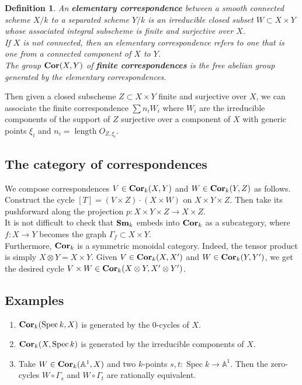 \documentclass[a4paper, 11pt]{article} %
\newtheorem{definition}[theorem]{Definition}
\theoremstyle{remark}
\newcommand{\?}{{\color{red} ???}}
\newcommand{\mb}{\mathbb}
\newcommand{\A}{\mb{A}}
\newcommand{\catname}[1]{{\normalfont\textbf{#1}}}
\newcommand{\Sm}{\catname{Sm}}
\newcommand{\Cor}{\catname{Cor}}
\DeclareMathOperator{\Spec}{Spec}
\DeclareMathOperator{\len}{length}
\begin{document}
\begin{definition}
An \textbf{elementary correspondence} between a smooth connected scheme $X/k$ to a separated scheme $Y/k$ is an irreducible closed subset $W\subset X\times Y$ whose associated integral subscheme is finite and surjective over $X$. \\ 

If $X$ is not connected, then an elementary correspondence refers to one that is one from a connected component of $X$ to $Y$.   \\ 

The group $\Cor(X, Y)$ of \textbf{finite correspondences} is the free abelian group generated by the elementary correspondences.
\end{definition} 

Then given a closed subscheme $Z\subset X\times Y$ finite and surjective over $X$, we can associate the finite correspondence $\sum n_iW_i$ where $W_i$ are the irreducible components of the support of $Z$ surjective over a component of $X$ with generic points $\xi_i$ and $n_i =\len O_{Z, \xi_i}$. \\ 

\subsection{The category of correspondences}

We compose correspondences $V\in\Cor_k(X, Y)$ and $W\in \Cor_k(Y, Z)$ as follows.  Construct the cycle $[T] = (V\times Z)\cdot (X\times W)$ on $X\times Y\times Z$.  Then take its pushforward along the projection $p:X\times Y\times Z\rightarrow X\times Z$. \\ 

It is not difficult to check that $\Sm_k$ embeds into $\Cor_k$ as a subcategory, where $f:X\rightarrow Y$ becomes the graph $\Gamma_f\subset X\times Y$. \\ 

Furthermore, $\Cor_k$ is a symmetric monoidal category.  Indeed, the tensor product is simply $X\otimes Y=X\times Y$.  Given $V\in \Cor_k(X, X')$ and $W\in \Cor_k(Y, Y')$, we get the desired cycle $V\times W\in \Cor_k(X\otimes Y, X'\otimes Y')$. 

\subsection{Examples} 
\begin{enumerate}
\item $\Cor_k(\Spec k, X)$ is generated by the $0$-cycles of $X$. 

\item $\Cor_k(X, \Spec k)$ is generated by the irreducible components of $X$. 

\item Take $W\in \Cor_k(\A^1, X)$ and two $k$-points $s, t:\Spec k\rightarrow \A^1$.  Then the zero-cycles $W\circ \Gamma_s$ and $W\circ \Gamma_t$ are rationally equivalent. 
\end{enumerate}
\end{document}
